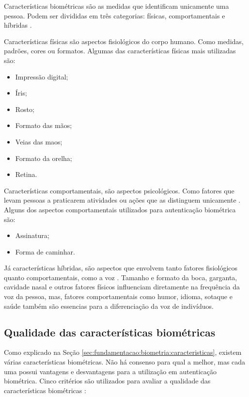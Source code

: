 \par Características biométricas são as medidas que identificam unicamente uma pessoa. Podem ser divididas em três categorias: físicas, comportamentais e híbridas \cite{li2009encyclopedia}.

\par Características físicas são aspectos fisiológicos do corpo humano. Como medidas, padrões, cores ou
formatos. Algumas das características físicas mais utilizadas são:

\begin{itemize}
    \item Impressão digital;
    \item Íris;
    \item Rosto;
    \item Formato das mãos;
    \item Veias das maos;
    \item Formato da orelha;
    \item Retina.
\end{itemize}

\par Características comportamentais, são aspectos psicológicos. Como fatores que levam pessoas a praticarem atividades ou ações que as distinguem unicamente \cite{wayman2005biometric}. Alguns dos aspectos comportamentais utilizados para autenticação biométrica são:

\begin{itemize}
    \item Assinatura;
    \item Forma de caminhar.
\end{itemize}

\par Já características híbridas, são aspectos que envolvem tanto fatores fisiológicos quanto comportamentais, como a voz \cite{wayman2005biometric}. Tamanho e formato da boca, garganta, cavidade nasal e outros fatores físicos influenciam diretamente na frequência da voz da pessoa, mas, fatores comportamentais como humor, idioma, sotaque e saúde também são essencias para a diferenciação da voz de indivíduos.

\subsection{Qualidade das características biométricas} \label{sec:fundamentacao:biometria:criterios}

\par Como explicado na Seção \ref{sec:fundamentacao:biometria:caracteristicas}, existem várias características biométricas. Não há consenso para qual a melhor, mas cada uma possui vantagens e desvantagens para a utilização em autenticação biométrica. Cinco critérios são utilizados para avaliar a qualidade das características biométricas \cite{wayman2001}:

